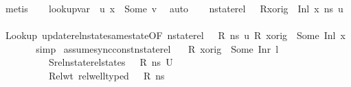 \begin{isabellebody}
\ metis\isanewline
\ \ \isamarkupfalse%
\ {\isachardoublequoteopen}lookup{\isacharunderscore}{\kern0pt}var\ {\isasymLambda}{\isacharprime}{\kern0pt}\ u{\isacharprime}{\kern0pt}\ x{}\ {\isacharequal}{\kern0pt}\ Some\ {\isacharquery}{\kern0pt}v{\isachardoublequoteclose}\ \isamarkupfalse%
\ auto\isanewline
\ \ \isamarkupfalse%
\ {\isachardoublequoteopen}nstate{\isacharunderscore}{\kern0pt}rel\ {\isasymLambda}\ {\isasymLambda}{\isacharprime}{\kern0pt}\ {\isacharparenleft}{\kern0pt}R{\isacharparenleft}{\kern0pt}x{\isacharunderscore}{\kern0pt}orig\ {\isasymmapsto}\ {\isacharparenleft}{\kern0pt}Inl\ x{}{\isacharparenright}{\kern0pt}{\isacharparenright}{\kern0pt}{\isacharparenright}{\kern0pt}\ ns\ u{\isacharprime}{\kern0pt}{\isachardoublequoteclose}\isanewline
\ \ \ \ \isamarkupfalse%
\ Lookup{}\ update{\isacharunderscore}{\kern0pt}rel{\isacharunderscore}{\kern0pt}nstate{\isacharunderscore}{\kern0pt}same{\isacharunderscore}{\kern0pt}state{\isacharbrackleft}{\kern0pt}OF\ {\isacartoucheopen}nstate{\isacharunderscore}{\kern0pt}rel\ {\isasymLambda}\ {\isasymLambda}{\isacharprime}{\kern0pt}\ R\ ns\ u{\isacharprime}{\kern0pt}{\isacartoucheclose}\ {\isacartoucheopen}R\ x{\isacharunderscore}{\kern0pt}orig\ {\isacharequal}{\kern0pt}\ Some\ {\isacharparenleft}{\kern0pt}Inl\ x{}{\isacharparenright}{\kern0pt}{\isacartoucheclose}{\isacharbrackright}{\kern0pt}\ \isanewline
\ \ \ \ \isamarkupfalse%
\ simp\isanewline
{}\isamarkupfalse%
%
\endisatagproof
{\isafoldproof}%
%
\isadelimproof
\isanewline
%
\endisadelimproof
\isanewline
{}\isamarkupfalse%
\ assume{\isacharunderscore}{\kern0pt}sync{\isacharunderscore}{\kern0pt}const{\isacharunderscore}{\kern0pt}nstate{\isacharunderscore}{\kern0pt}rel{\isacharcolon}{\kern0pt}\isanewline
\ \ \ {\isachardoublequoteopen}R\ x{\isacharunderscore}{\kern0pt}orig\ {\isacharequal}{\kern0pt}\ Some\ {\isacharparenleft}{\kern0pt}Inr\ l{\isacharparenright}{\kern0pt}{\isachardoublequoteclose}\ \isanewline
\ \ \ \ \ \ \ \ \ \ Srel{\isacharcolon}{\kern0pt}{\isachardoublequoteopen}nstate{\isacharunderscore}{\kern0pt}rel{\isacharunderscore}{\kern0pt}states\ {\isasymLambda}\ {\isasymLambda}{\isacharprime}{\kern0pt}\ R\ ns\ U{\isachardoublequoteclose}\ \ \isanewline
\ \ \ \ \ \ \ \ \ \ Rel{\isacharunderscore}{\kern0pt}wt{\isacharcolon}{\kern0pt}\ {\isachardoublequoteopen}rel{\isacharunderscore}{\kern0pt}well{\isacharunderscore}{\kern0pt}typed\ {\isasymLambda}\ {\isasymOmega}\ R\ ns{\isachardoublequoteclose}\isanewline

\end{isabellebody}
